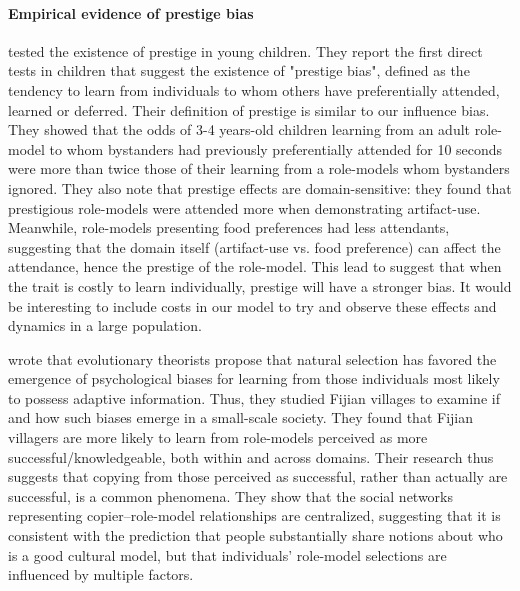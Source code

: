 \documentclass[12pt]{extarticle}
\begin{document}
\paragraph{Empirical evidence of prestige bias}
\citet{prestige_cultural_learning} tested the existence of prestige in young children. 
They report the first direct tests in children that suggest the existence of "prestige bias", defined as the tendency to learn from individuals to whom others have preferentially attended, learned or deferred.
Their definition of prestige is similar to our influence bias. They showed that the odds of 3-4 years-old children learning from an adult role-model to whom bystanders had previously preferentially attended for 10 seconds were more than twice those of their learning from a role-models whom bystanders ignored.
They also note that prestige effects are domain-sensitive: they found that prestigious role-models were attended more when demonstrating artifact-use. Meanwhile, role-models presenting food preferences had less attendants, suggesting that the domain itself (artifact-use vs. food preference) can affect the attendance, hence the prestige of the role-model.
This lead \citet{prestige_cultural_learning} to suggest that when the trait is costly to learn individually, prestige will have a stronger bias.
It would be interesting to include costs in our model to try and observe these effects and dynamics in a large population.

\citet{fijian_social_bias} wrote that evolutionary theorists propose that natural selection has favored the emergence of psychological biases for learning from those individuals most likely to possess adaptive information. 
Thus, they studied Fijian villages to examine if and how such biases emerge in a small-scale society.
They found that Fijian villagers are more likely to learn from role-models perceived as more successful/knowledgeable, both within and across domains.
Their research thus suggests that copying from those perceived as successful, rather than actually are successful, is a common phenomena. 
They show that the social networks representing copier--role-model relationships are centralized, suggesting that it is consistent with the prediction that people substantially share notions about who is a good cultural model, but that individuals' role-model selections are influenced by multiple factors.
\end{document}
